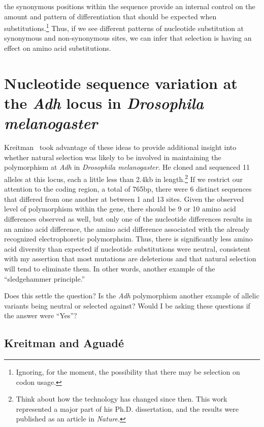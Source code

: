 \documentclass[12pt]{article}
\begin{document}
\noindent the synonymous positions within the sequence provide an
internal control on the amount and pattern of differentiation that
should be expected when substitutions.\footnote{Ignoring, for the
  moment, the possibility that there may be selection on codon usage.}
Thus, if we see different patterns of nucleotide substitution at
synonymous and non-synonymous sites, we can infer that selection is
having an effect on amino acid substitutions.

\section*{Nucleotide sequence variation at the {\it Adh\/} locus in
  {\it Drosophila melanogaster}}

Kreitman~\cite{Kreitman83} took advantage of these ideas to provide
additional insight into whether natural selection was likely to be
involved in maintaining the polymorphism at {\it Adh\/} in {\it
  Drosophila melanogaster}. He cloned and sequenced 11 alleles at this
locus, each a little less than 2.4kb in length.\footnote{Think about
  how the technology has changed since then. This work represented a
  major part of his Ph.D. dissertation, and the results were published
  as an article in {\it Nature}.} If we restrict our attention to the
coding region, a total of 765bp, there were 6 distinct sequences that
differed from one another at between 1 and 13 sites. Given the
observed level of polymorphism within the gene, there should be 9 or
10 amino acid differences observed as well, but only one of the
nucleotide differences results in an amino acid difference, the amino
acid difference associated with the already recognized electrophoretic
polymorphsim. Thus, there is significantly less amino acid diversity
than expected if nucleotide substitutions were neutral, consistent
with my assertion that most mutations are deleterious and that natural
selection will tend to eliminate them.
In other words, another example of the ``sledgehammer
principle.''

Does this settle the question? Is the {\it Adh\/} polymorphism another
example of allelic variants being neutral or selected against? Would I
be asking these questions if the answer were ``Yes''?

\subsection*{Kreitman and Aguad{\'e}}
\end{document}
